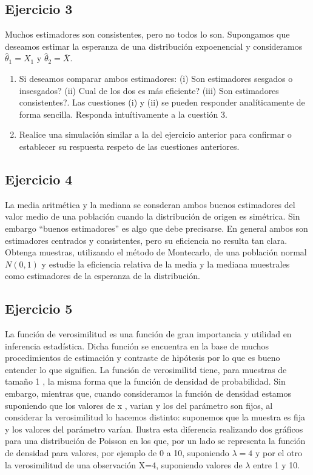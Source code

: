 \documentclass[
]{article}
\providecommand{\tightlist}{%
  \setlength{\itemsep}{0pt}\setlength{\parskip}{0pt}}
\begin{document}
\subsection{Ejercicio 3}\label{ejercicio-3-2}

Muchos estimadores son consistentes, pero no todos lo son. Supongamos que deseamos estimar la esperanza de una distribución expoenencial y consideramos \(\hat \theta_1 = X_1\) y \(\hat\theta_2=\overline{X}\).

\begin{enumerate}
\def\labelenumi{\alph{enumi}.}
\tightlist
\item
  Si deseamos comparar ambos estimadores: (i) Son estimadores sesgados o insesgados? (ii) Cual de los dos es más eficiente? (iii) Son estimadores consistentes?. Las cuestiones (i) y (ii) se pueden responder analíticamente de forma sencilla. Responda intuítivamente a la cuestión 3.
\item
  Realice una simulación similar a la del ejercicio anterior para confirmar o establecer su respuesta respeto de las cuestiones anteriores.
\end{enumerate}

\subsection{Ejercicio 4}\label{ejercicio-4-1}

La media aritmética y la mediana se consderan ambos buenos estimadores del valor medio de una población cuando la distribución de origen es simétrica. Sin embargo ``buenos estimadores'' es algo que debe precisarse. En general ambos son estimadores centrados y consistentes, pero su eficiencia no resulta tan clara.
Obtenga muestras, utilizando el método de Montecarlo, de una población normal \(N(0,1)\) y estudie la eficiencia relativa de la media y la mediana muestrales como estimadores de la esperanza de la distribución.

\subsection{Ejercicio 5}\label{ejercicio-5-2}

La función de verosimilitud es una función de gran importancia y utilidad en inferencia estadística. Dicha función se encuentra en la base de muchos procedimientos de estimación y contraste de hipótesis por lo que es bueno entender lo que significa. La función de verosimilitd tiene, para muestras de tamaño 1 , la misma forma que la función de densidad de probabilidad. Sin embargo, mientras que, cuando consideramos la función de densidad estamos suponiendo que los valores de x , varian y los del parámetro son fijos, al considerar la verosimilitud lo hacemos distinto: suponemos que la muestra es fija y los valores del parámetro varían. Ilustra esta diferencia realizando dos gráficos para una distribución de Poisson en los que, por un lado se representa la función de densidad para valores, por ejemplo de 0 a 10, suponiendo \(\lambda=4\) y por el otro la verosimilitud de una observación X=4, suponiendo valores de \(\lambda\) entre 1 y 10.
\end{document}

